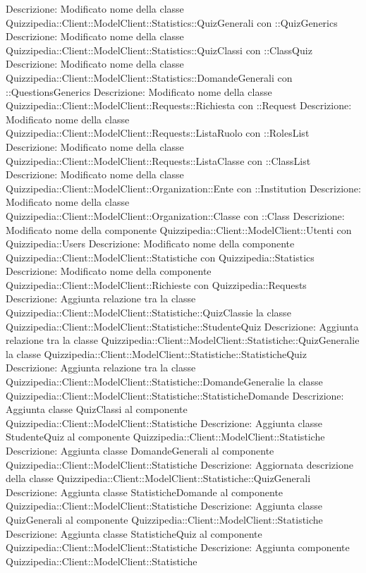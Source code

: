 Descrizione: Modificato nome della classe Quizzipedia::Client::ModelClient::Statistics::QuizGenerali con ::QuizGenerics 
Descrizione: Modificato nome della classe Quizzipedia::Client::ModelClient::Statistics::QuizClassi con ::ClassQuiz 
Descrizione: Modificato nome della classe Quizzipedia::Client::ModelClient::Statistics::DomandeGenerali con ::QuestionsGenerics 
Descrizione: Modificato nome della classe Quizzipedia::Client::ModelClient::Requests::Richiesta con ::Request 
Descrizione: Modificato nome della classe Quizzipedia::Client::ModelClient::Requests::ListaRuolo con ::RolesList 
Descrizione: Modificato nome della classe Quizzipedia::Client::ModelClient::Requests::ListaClasse con ::ClassList 
Descrizione: Modificato nome della classe Quizzipedia::Client::ModelClient::Organization::Ente con ::Institution 
Descrizione: Modificato nome della classe Quizzipedia::Client::ModelClient::Organization::Classe con ::Class 
Descrizione: Modificato nome della componente Quizzipedia::Client::ModelClient::Utenti con Quizzipedia::Users 
Descrizione: Modificato nome della componente Quizzipedia::Client::ModelClient::Statistiche con Quizzipedia::Statistics 
Descrizione: Modificato nome della componente Quizzipedia::Client::ModelClient::Richieste con Quizzipedia::Requests 
Descrizione: Aggiunta relazione tra la classe Quizzipedia::Client::ModelClient::Statistiche::QuizClassie la classe Quizzipedia::Client::ModelClient::Statistiche::StudenteQuiz 
Descrizione: Aggiunta relazione tra la classe Quizzipedia::Client::ModelClient::Statistiche::QuizGeneralie la classe Quizzipedia::Client::ModelClient::Statistiche::StatisticheQuiz 
Descrizione: Aggiunta relazione tra la classe Quizzipedia::Client::ModelClient::Statistiche::DomandeGeneralie la classe Quizzipedia::Client::ModelClient::Statistiche::StatisticheDomande 
Descrizione: Aggiunta classe QuizClassi al componente Quizzipedia::Client::ModelClient::Statistiche 
Descrizione: Aggiunta classe StudenteQuiz al componente Quizzipedia::Client::ModelClient::Statistiche 
Descrizione: Aggiunta classe DomandeGenerali al componente Quizzipedia::Client::ModelClient::Statistiche 
Descrizione: Aggiornata descrizione della classe Quizzipedia::Client::ModelClient::Statistiche::QuizGenerali 
Descrizione: Aggiunta classe StatisticheDomande al componente Quizzipedia::Client::ModelClient::Statistiche 
Descrizione: Aggiunta classe QuizGenerali al componente Quizzipedia::Client::ModelClient::Statistiche 
Descrizione: Aggiunta classe StatisticheQuiz al componente Quizzipedia::Client::ModelClient::Statistiche 
Descrizione: Aggiunta componente Quizzipedia::Client::ModelClient::Statistiche 
